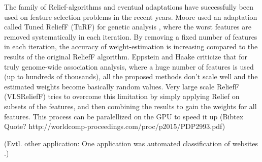 The family of Relief-algorithms and eventual adaptations have successfully been used on feature selection problems in the recent years. Moore used an adaptation called Tuned ReliefF (TuRF) for genetic analysis \cite{Moore:07}, where the worst features are removed systematically in each iteration. By removing a fixed number of features in each iteration, the accuracy of weight-estimation is increasing compared to the results of the original ReliefF algorithm. Eppstein and Haake \cite{Eppstein:08} criticize that for truly genome-wide association analysis, where a huge number of features is used (up to hundreds of thousands), all the proposed methods don't scale well and the estimated weights become basically random values. Very large scale ReliefF (VLSReliefF) tries to overcome this limitation by simply applying Relief on subsets of the features, and then combining the results to gain the weights for all features. This process can be paralellized on the GPU to speed it up \cite{} (Bibtex Quote? http://worldcomp-proceedings.com/proc/p2015/PDP2993.pdf)

(Evtl. other application: One application was automated classification of websites \cite{Jin:07}.)

